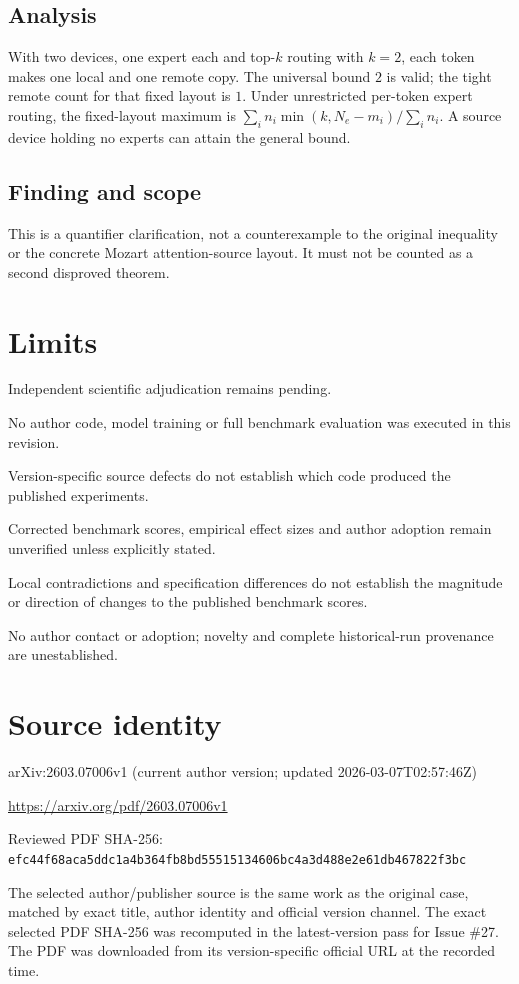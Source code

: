 \documentclass[11pt]{article}
\begin{document}
\subsection*{Analysis}

With two devices, one expert each and top-\(k\) routing with \(k=2\), each token makes one local and one remote copy. The universal bound \(2\) is valid; the tight remote count for that fixed layout is \(1\). Under unrestricted per-token expert routing, the fixed-layout maximum is \(\sum_i n_i\min(k,N_e-m_i)/\sum_i n_i\). A source device holding no experts can attain the general bound.

\subsection*{Finding and scope}

This is a quantifier clarification, not a counterexample to the original inequality or the concrete Mozart attention-source layout. It must not be counted as a second disproved theorem.

\section*{Limits}

Independent scientific adjudication remains pending.\par

No author code, model training or full benchmark evaluation was executed in this revision.\par

Version-specific source defects do not establish which code produced the published experiments.\par

Corrected benchmark scores, empirical effect sizes and author adoption remain unverified unless explicitly stated.\par

Local contradictions and specification differences do not establish the magnitude or direction of changes to the published benchmark scores.\par

No author contact or adoption; novelty and complete historical-run provenance are unestablished.\par

\section*{Source identity}

arXiv:2603.07006v1 (current author version; updated 2026-03-07T02:57:46Z)

\url{https://arxiv.org/pdf/2603.07006v1}

Reviewed PDF SHA-256: \nolinkurl{efc44f68aca5ddc1a4b364fb8bd55515134606bc4a3d488e2e61db467822f3bc}

The selected author/publisher source is the same work as the original case, matched by exact title, author identity and official version channel. The exact selected PDF SHA-256 was recomputed in the latest-version pass for Issue \#27. The PDF was downloaded from its version-specific official URL at the recorded time.
\end{document}
